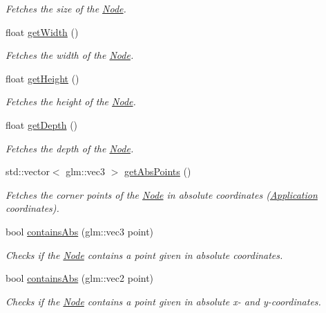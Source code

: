 \begin{DoxyCompactItemize}
\begin{DoxyCompactList}\small\item\em Fetches the size of the \mbox{\hyperlink{classsage_1_1Node}{Node}}. \end{DoxyCompactList}\item 
float \mbox{\hyperlink{classsage_1_1Node_a65163ffabcfe9f482282ea37ead6fc5f}{get\+Width}} ()
\begin{DoxyCompactList}\small\item\em Fetches the width of the \mbox{\hyperlink{classsage_1_1Node}{Node}}. \end{DoxyCompactList}\item 
float \mbox{\hyperlink{classsage_1_1Node_a6af5a8378ac8d2c3490adbc2a03f1247}{get\+Height}} ()
\begin{DoxyCompactList}\small\item\em Fetches the height of the \mbox{\hyperlink{classsage_1_1Node}{Node}}. \end{DoxyCompactList}\item 
float \mbox{\hyperlink{classsage_1_1Node_a5c4c28939c7adf7e4a65dbb02c0cbcd3}{get\+Depth}} ()
\begin{DoxyCompactList}\small\item\em Fetches the depth of the \mbox{\hyperlink{classsage_1_1Node}{Node}}. \end{DoxyCompactList}\item 
std\+::vector$<$ glm\+::vec3 $>$ \mbox{\hyperlink{classsage_1_1Node_a59ed0e3a59713eef867f9e4948dcddcf}{get\+Abs\+Points}} ()
\begin{DoxyCompactList}\small\item\em Fetches the corner points of the \mbox{\hyperlink{classsage_1_1Node}{Node}} in absolute coordinates (\mbox{\hyperlink{classsage_1_1Application}{Application}} coordinates). \end{DoxyCompactList}\item 
bool \mbox{\hyperlink{classsage_1_1Node_a3c1dc218e31de4929367c6bd149cc399}{contains\+Abs}} (glm\+::vec3 point)
\begin{DoxyCompactList}\small\item\em Checks if the \mbox{\hyperlink{classsage_1_1Node}{Node}} contains a point given in absolute coordinates. \end{DoxyCompactList}\item 
bool \mbox{\hyperlink{classsage_1_1Node_a5ab70d0b3fc9a167175f7f864549db4d}{contains\+Abs}} (glm\+::vec2 point)
\begin{DoxyCompactList}\small\item\em Checks if the \mbox{\hyperlink{classsage_1_1Node}{Node}} contains a point given in absolute x-\/ and y-\/coordinates. \end{DoxyCompactList}\item 

\end{DoxyCompactItemize}

